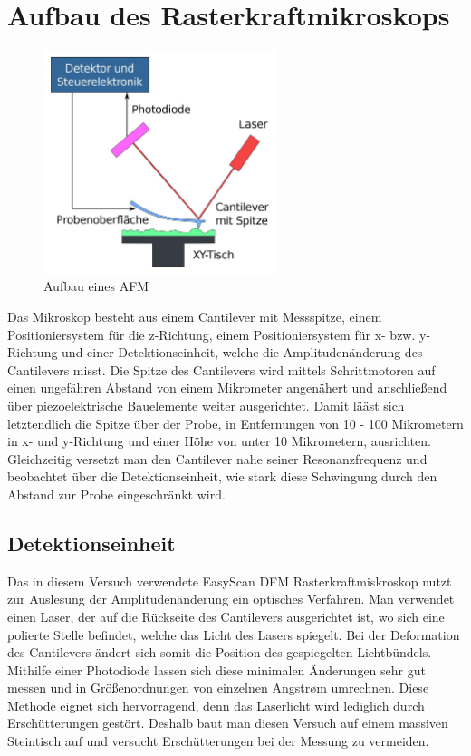  \section{Aufbau des Rasterkraftmikroskops}
\begin{figure}[h!]
    \centering
    \includegraphics[width=0.6\textwidth]{Abb/afm.jpg}
    \caption{Aufbau eines AFM}
    \label{afm}
\end{figure}

Das Mikroskop besteht aus einem Cantilever mit Messspitze, einem Positioniersystem für die z-Richtung, einem Positioniersystem für x- bzw. y-Richtung und einer Detektionseinheit, welche die Amplitudenänderung des Cantilevers misst.  
Die Spitze des Cantilevers wird mittels Schrittmotoren auf einen ungefähren Abstand von einem Mikrometer angenähert und anschließend über piezoelektrische Bauelemente weiter ausgerichtet.
Damit lääst sich letztendlich die Spitze über der Probe, in Entfernungen von 10 - 100 Mikrometern in x- und y-Richtung und einer Höhe von unter 10 Mikrometern, ausrichten.
Gleichzeitig versetzt man den Cantilever nahe seiner Resonanzfrequenz und beobachtet über die Detektionseinheit, wie stark diese Schwingung durch den Abstand zur Probe eingeschränkt wird.

 \subsection{Detektionseinheit}
 
 Das in diesem Versuch verwendete EasyScan DFM Rasterkraftmiskroskop nutzt zur Auslesung der Amplitudenänderung ein optisches Verfahren. 
 Man verwendet einen Laser, der auf die Rückseite des Cantilevers ausgerichtet ist, wo sich eine polierte Stelle befindet, welche das Licht des Lasers spiegelt.
 Bei der Deformation des Cantilevers ändert sich somit die Position des gespiegelten Lichtbündels.
 Mithilfe einer Photodiode lassen sich diese minimalen Änderungen sehr gut messen und in Größenordnungen von einzelnen Angstrøm umrechnen.
 Diese Methode eignet sich hervorragend, denn das Laserlicht wird lediglich durch Erschütterungen gestört.
 Deshalb baut man diesen Versuch auf einem massiven Steintisch auf und versucht Erschütterungen bei der Messung zu vermeiden.

